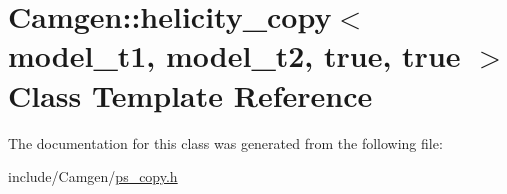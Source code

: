 \hypertarget{a00265}{\section{Camgen\-:\-:helicity\-\_\-copy$<$ model\-\_\-t1, model\-\_\-t2, true, true $>$ Class Template Reference}
\label{a00265}
}


The documentation for this class was generated from the following file\-:\begin{DoxyCompactItemize}
\item 
include/\-Camgen/\hyperlink{a00712}{ps\-\_\-copy.\-h}\end{DoxyCompactItemize}
